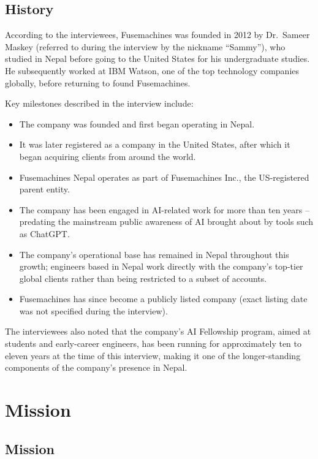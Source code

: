\documentclass[12pt,a4paper]{report}
\begin{document}
\section{History}

According to the interviewees, Fusemachines was founded in 2012 by Dr.\ Sameer Maskey (referred to during the interview by the nickname ``Sammy''), who studied in Nepal before going to the United States for his undergraduate studies. He subsequently worked at IBM Watson, one of the top technology companies globally, before returning to found Fusemachines.

Key milestones described in the interview include:
\begin{itemize}[leftmargin=1.5cm]
  \item The company was founded and first began operating in Nepal.
  \item It was later registered as a company in the United States, after which it began acquiring clients from around the world.
  \item Fusemachines Nepal operates as part of Fusemachines Inc., the US-registered parent entity.
  \item The company has been engaged in AI-related work for more than ten years -- predating the mainstream public awareness of AI brought about by tools such as ChatGPT.
  \item The company's operational base has remained in Nepal throughout this growth; engineers based in Nepal work directly with the company's top-tier global clients rather than being restricted to a subset of accounts.
  \item Fusemachines has since become a publicly listed company (exact listing date was not specified during the interview).
\end{itemize}

The interviewees also noted that the company's AI Fellowship program, aimed at students and early-career engineers, has been running for approximately ten to eleven years at the time of this interview, making it one of the longer-standing components of the company's presence in Nepal.

\chapter{Mission}

\section{Mission}
\end{document}
